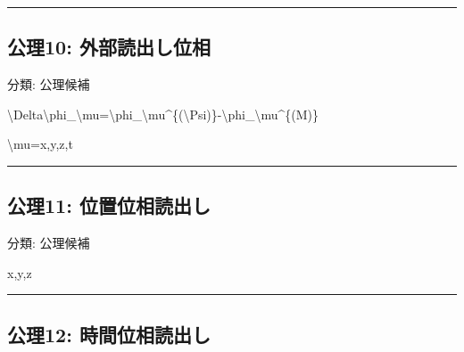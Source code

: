 \documentclass[
  a4paper]{ltjsarticle}
\newenvironment{Shaded}{}{}
\newcommand{\NormalTok}[1]{#1}
\begin{document}
\begin{center}\rule{0.5\linewidth}{0.5pt}\end{center}

\subsection{公理10:
外部読出し位相}\label{ux516cux740610-ux5916ux90e8ux8aadux51faux3057ux4f4dux76f8}

分類: 公理候補

\begin{Shaded}
\begin{Highlighting}[]
\NormalTok{\textbackslash{}Delta\textbackslash{}phi\_\textbackslash{}mu=\textbackslash{}phi\_\textbackslash{}mu\^{}\{(\textbackslash{}Psi)\}{-}\textbackslash{}phi\_\textbackslash{}mu\^{}\{(M)\}}
\end{Highlighting}
\end{Shaded}

\begin{Shaded}
\begin{Highlighting}[]
\NormalTok{\textbackslash{}mu=x,y,z,t}
\end{Highlighting}
\end{Shaded}

\begin{center}\rule{0.5\linewidth}{0.5pt}\end{center}

\subsection{公理11:
位置位相読出し}\label{ux516cux740611-ux4f4dux7f6eux4f4dux76f8ux8aadux51faux3057}

分類: 公理候補

\begin{Shaded}
\begin{Highlighting}[]
\NormalTok{x,y,z}
\end{Highlighting}
\end{Shaded}

\begin{center}\rule{0.5\linewidth}{0.5pt}\end{center}

\subsection{公理12:
時間位相読出し}\label{ux516cux740612-ux6642ux9593ux4f4dux76f8ux8aadux51faux3057}
\end{document}
